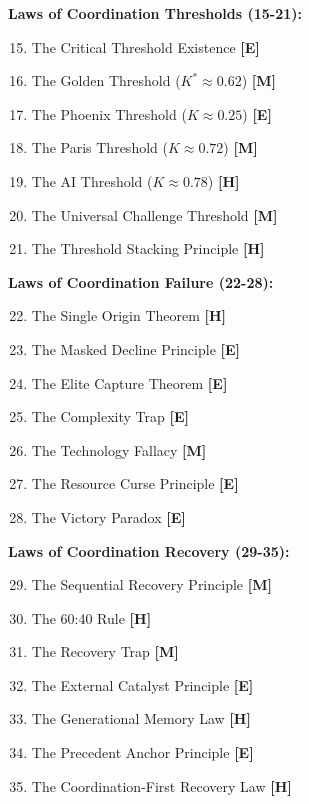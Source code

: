 \documentclass[12pt,letterpaper]{article}
\begin{document}
\textbf{Laws of Coordination Thresholds (15-21):}
\begin{enumerate}
\setcounter{enumi}{14}
    \item The Critical Threshold Existence \textbf{[E]}
    \item The Golden Threshold ($K^* \approx 0.62$) \textbf{[M]}
    \item The Phoenix Threshold ($K \approx 0.25$) \textbf{[E]}
    \item The Paris Threshold ($K \approx 0.72$) \textbf{[M]}
    \item The AI Threshold ($K \approx 0.78$) \textbf{[H]}
    \item The Universal Challenge Threshold \textbf{[M]}
    \item The Threshold Stacking Principle \textbf{[H]}
\end{enumerate}

\textbf{Laws of Coordination Failure (22-28):}
\begin{enumerate}
\setcounter{enumi}{21}
    \item The Single Origin Theorem \textbf{[H]}
    \item The Masked Decline Principle \textbf{[E]}
    \item The Elite Capture Theorem \textbf{[E]}
    \item The Complexity Trap \textbf{[E]}
    \item The Technology Fallacy \textbf{[M]}
    \item The Resource Curse Principle \textbf{[E]}
    \item The Victory Paradox \textbf{[E]}
\end{enumerate}

\textbf{Laws of Coordination Recovery (29-35):}
\begin{enumerate}
\setcounter{enumi}{28}
    \item The Sequential Recovery Principle \textbf{[M]}
    \item The 60:40 Rule \textbf{[H]}
    \item The Recovery Trap \textbf{[M]}
    \item The External Catalyst Principle \textbf{[E]}
    \item The Generational Memory Law \textbf{[H]}
    \item The Precedent Anchor Principle \textbf{[E]}
    \item The Coordination-First Recovery Law \textbf{[H]}
\end{enumerate}
\end{document}
